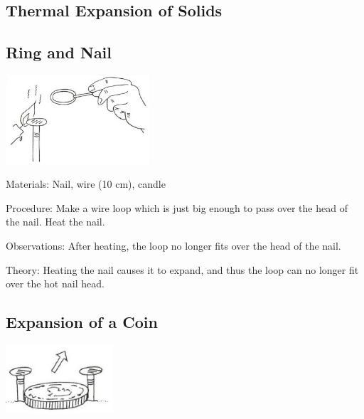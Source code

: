 \begin{multicols}{2}
\section*{Thermal Expansion of Solids}


\subsection{Ring and Nail}

\begin{center}
\includegraphics[width=0.4\textwidth]{./img/vso/ring-nail.png}
\end{center}

\begin{description*}
\item[Materials:]{Nail, wire (10 cm), candle}
\item[Procedure:]{Make a wire loop which is just big enough to pass over the head of the nail. Heat the nail.}
\item[Observations:]{After heating, the loop no longer fits over the head of the nail.}
\item[Theory:]{Heating the nail causes it to expand, and thus the loop can no longer fit over the hot nail head.}
\end{description*}

\subsection{Expansion of a Coin}

\begin{center}
\includegraphics[width=0.3\textwidth]{./img/vso/expansion-coin.png}
\end{center}


\end{multicols}
